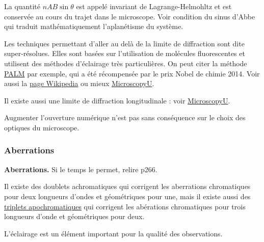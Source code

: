 \begin{remarque}
La quantité $nAB\sin\theta$ est appelé invariant de Lagrange-Helmohltz et est conservée au cours du trajet dans le microscope.
Voir condition du sinus d'Abbe qui traduit mathématiquement l'aplanétisme du système.

\noindent
Les techniques permettant d'aller au delà de la limite de diffraction sont dite super-résolues.
Elles sont basées sur l'utilisation de molécules fluorescentes et utilisent des méthodes d'éclairage très particulières.
On peut citer la méthode \href{https://science.sciencemag.org/content/313/5793/1642}{PALM} par exemple, qui a été récompensée par le prix Nobel de chimie 2014.
Voir aussi la \href{https://fr.wikipedia.org/wiki/Microscopie_PALM}{page Wikipedia} ou mieux \href{https://www.microscopyu.com/techniques/super-resolution/single-molecule-super-resolution-imaging}{MicroscopyU}.

\noindent
Il existe aussi une limite de diffraction longitudinale : voir \href{https://www.microscopyu.com/techniques/super-resolution/the-diffraction-barrier-in-optical-microscopy}{MicroscopyU}.
\end{remarque}

\begin{transition}
Augmenter l'ouverture numérique n'est pas sans conséquence sur le choix des optiques du microscope.
\end{transition}

\subsubsection{Aberrations}

\begin{slide}
\textbf{Aberrations.}
Si le temps le permet, relire \cite{Hecht2002} p266.
\end{slide}

\begin{remarque}
Il existe des doublets achromatiques qui corrigent les aberrations chromatiques pour deux longueurs d'ondes et géométriques pour une, mais il existe aussi des \href{https://fr.wikipedia.org/wiki/Triplet_apochromatique}{triplets apochromatiques} qui corrigent les abérations chromatiques pour trois longueurs d'onde et géométriques pour deux.
\end{remarque}

\begin{transition}
L'éclairage est un élément important pour la qualité des observations.
\end{transition}

